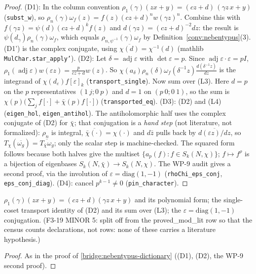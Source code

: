 \begin{proof}
  \leanok
  (D1): In the column convention $\rho_1(\gamma)(zx+y)=(cz+d)\,(\gamma z\,x+y)$ (\texttt{subst\_w}), so
  $\rho_n(\gamma)\omega_f(z)=f(z)(cz+d)^n w(\gamma z)^n$. Combine this with $f(\gamma z)=\psi(d)(cz+d)^{k}f(z)$ and
  $d(\gamma z)=(cz+d)^{-2}dz$: the result is $\psi(d_\gamma)\rho_n(\gamma)\omega_f$, which equals
  $\rho_{n,\psi^{-1}}(\gamma)\omega_f$ by Definition~\ref{conv:nebentypus}(3). (D1') is the complex conjugate, using
  $\overline{\chi(d)}=\chi^{-1}(d)$ (mathlib \texttt{MulChar.star\_apply'}).
  (D2): Let $\delta=\operatorname{adj}\varepsilon$ with $\det\varepsilon=p$. Since $\operatorname{adj}\varepsilon\cdot\varepsilon=pI$,
  $\rho_1(\operatorname{adj}\varepsilon)w(\varepsilon z)=\tfrac{p}{cz+d}w(z)$. So
  $\chi(a_\delta)\rho_n(\delta)\omega_f(\delta^{-1}z)\tfrac{d(\delta^{-1}z)}{dz}$ is the integrand of
  $\chi(d_\varepsilon)f[\varepsilon]_k$ (\texttt{transport\_single}). Now sum over (L3). Here $d=p$ on the $p$
  representatives $(1\ j;0\ p)$ and $d=1$ on $(p\ 0;0\ 1)$, so the sum is
  $\chi(p)\bigl(\sum_j f[\cdot]+\bar\chi(p)f[\cdot]\bigr)$ (\texttt{transported\_eq}).
  (D3): (D2) and (L4) (\texttt{eigen\_hol}, \texttt{eigen\_antihol}). The antiholomorphic half uses the complex
  conjugate of (D2) for $\bar\chi$; that conjugation is a \emph{hand step} (not literature, not formalized): $\rho_n$ is
  integral, $\overline{\bar\chi(\cdot)}=\chi(\cdot)$ and $d\bar z$ pulls back by $\overline{d(\varepsilon z)/dz}$, so
  $T_\chi(\overline{\omega_g})=\overline{T_{\bar\chi}\omega_g}$; only the scalar step is machine-checked. The squared form follows because both halves give
  the multiset $\{a_p(f):f\in S_k(N,\chi)\}$; $f\mapsto f^\rho$ is a bijection of eigenbases
  $S_k(N,\bar\chi)\to S_k(N,\chi)$. The WP-9 audit gives a second proof, via the involution of $\varepsilon=\mathrm{diag}(1,-1)$
  (\texttt{rhoChi\_eps\_conj}, \texttt{eps\_conj\_diag}).
  (D4): cancel $p^{k-1}\neq0$ (\texttt{pin\_character}).
\end{proof}

\begin{lemma}\label{bridge:nebentypus-dictionary-aux}
  \leanok
  $\rho_1(\gamma)(zx+y)=(cz+d)(\gamma z\,x+y)$ and its polynomial form; the single-coset transport identity of (D2) and its sum over
  (L3); the $\varepsilon=\mathrm{diag}(1,-1)$ conjugation. (F3-19 MINOR 5: split off from the \textsf{proved\_mod\_lit} row so that the census counts declarations, not rows: none of these carries a literature hypothesis.)
\end{lemma}
\begin{proof}
  \leanok
  As in the proof of \ref{bridge:nebentypus-dictionary} ((D1), (D2), the WP-9 second proof).
\end{proof}

